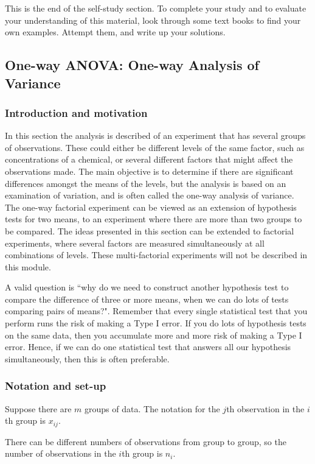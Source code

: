 \documentclass[12pt]{article}
\theoremstyle{break}
\begin{document}
This is the end of the self-study section. To complete your study and to evaluate your understanding of this material, look through some text books to find your own examples. Attempt them, and write up your solutions.

\newpage

\subsection{One-way ANOVA: One-way Analysis of Variance}
\subsubsection{Introduction and motivation}
In this section the analysis is described of an experiment that has several groups of observations. These could either be different levels of the same factor, such as concentrations of a chemical, or several different factors that might affect the observations made. The main objective is to determine if there are significant differences amongst the means of the levels, but the analysis is based on an examination of variation, and is often called the one-way analysis of variance. The one-way factorial experiment can be viewed as an extension of  hypothesis tests for two means, to an experiment where there are more than two groups to be compared. The ideas presented in this section can be extended to factorial experiments, where several factors are measured simultaneously at all combinations of levels. These multi-factorial experiments will not be described in this module.

A valid question is ``why do we need to construct another hypothesis test to compare the difference of three or more means, when we can do lots of tests comparing pairs of means?". Remember that every single statistical test that you perform runs the risk of making a Type I error. If you do lots of hypothesis tests on the same data, then you accumulate more and more risk of making a Type I error. Hence, if we can do one statistical test that answers all our hypothesis simultaneously, then this is often preferable.

\subsubsection{Notation and set-up}
Suppose there are $m$ groups of data. The notation for the $j$th observation in the $i$th group is $x_{ij}$.

There can be different numbers of observations from group to group, so the number of observations in the $i$th group is $n_i$.
\end{document}
